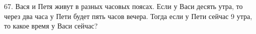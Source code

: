 67. Вася и Петя живут в разных часовых поясах. Если у Васи десять утра, то через два часа у Пети будет пять часов вечера. Тогда если у Пети сейчас 9 утра, то какое время у Васи сейчас?\\

